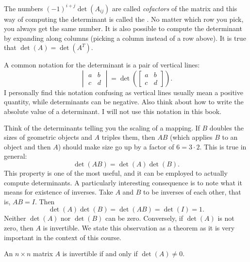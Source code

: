 The numbers ${(-1)}^{i+j}\det(A_{ij})$ are called
\emph{cofactors}
of the matrix and
this way of computing the determinant is called the
\emph{}.
No matter which row you pick, you always get the same number.
It is also possible to compute the
determinant by expanding
along columns (picking a column instead of a row above).
It is true that $\det(A) = \det(A^T)$.

A common notation for the determinant is a pair of vertical
lines:
\begin{equation*}
\begin{vmatrix}
a & b \\
c & d
\end{vmatrix}
=
\det \left(
\begin{bmatrix}
a & b \\
c & d
\end{bmatrix}
\right) .
\end{equation*}
I personally find this notation confusing as vertical lines usually
mean a positive quantity, while determinants can be negative.  Also
think about how to write the absolute value of a determinant.  I will not
use this notation in this book.

\medskip

Think of the determinants telling you the scaling of a mapping.  
If $B$ doubles the sizes of geometric objects and $A$ triples them,
then $AB$ (which applies $B$ to an object and then $A$) should make size
go up by a factor of $6 = 3 \cdot 2$.  This is true in general:
\begin{equation*}
\det(AB) = \det(A)\det(B) .
\end{equation*}
This property is one of the most useful, and it can be employed to 
actually compute determinants.  A particularly interesting consequence is to
note what it means for existence of inverses.
Take $A$ and $B$ to be inverses of each other, that is, $AB=I$.  Then
\begin{equation*}
\det(A)\det(B) = \det(AB) = \det(I) = 1 .
\end{equation*}
Neither $\det(A)$ nor $\det(B)$ can be zero.
Conversely, if $\det(A)$ is not zero, then $A$ is
invertible.
We state this observation as a theorem
as it is very important in the context of this course.

\begin{theorem}
An $n \times n$ matrix $A$ is invertible if and only if $\det (A) \neq 0$.
\end{theorem}

